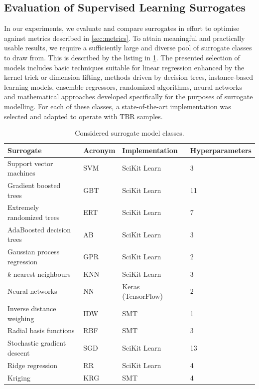 \subsection{Evaluation of Supervised Learning Surrogates}
\label{sec:supervised}

In our experiments, we evaluate and compare surrogates in effort to
optimise against metrics described in \cref{sec:metrics}. To attain meaningful
and practically usable results, we require a sufficiently large and diverse pool
of surrogate classes to draw from. This is described by the listing in
\cref{tbl:surrogates}. The presented selection of models includes basic
techniques suitable for linear regression enhanced by the kernel trick or dimension
lifting, methods driven by decision trees, instance-based learning models,
ensemble regressors, randomized algorithms, neural networks and mathematical approaches
developed specifically for the purposes of surrogate modelling. For each of
these classes, a state-of-the-art implementation was selected and adapted to
operate with TBR samples.

\begin{table}[h]
	\centering
	{\footnotesize
		\begin{tabular}{llll}
		\toprule
		Surrogate & Acronym & Implementation & Hyperparameters \\
		\midrule
		Support vector machines	& SVM & SciKit Learn~\cite{scikit-learn} & 3 \\
		Gradient boosted trees	& GBT & SciKit Learn & 11 \\
		Extremely randomized trees	& ERT & SciKit Learn & 7 \\
		AdaBoosted decision trees	& AB & SciKit Learn & 3 \\
		Gaussian process regression	& GPR & SciKit Learn & 2 \\
		$k$ nearest neighbours	& KNN & SciKit Learn & 3 \\
		Neural networks	& NN & Keras (TensorFlow)~\cite{chollet2015keras} & 2 \\
		Inverse distance weighing & IDW & SMT~\cite{SMT2019} & 1 \\
		Radial basis functions & RBF & SMT & 3 \\
		Stochastic gradient descent & SGD & SciKit Learn & 13 \\
		Ridge regression & RR & SciKit Learn & 4 \\
		Kriging & KRG & SMT & 4 \\
		\bottomrule
		\end{tabular}
	}
	\caption{Considered surrogate model classes.}
	\label{tbl:surrogates}
\end{table}

